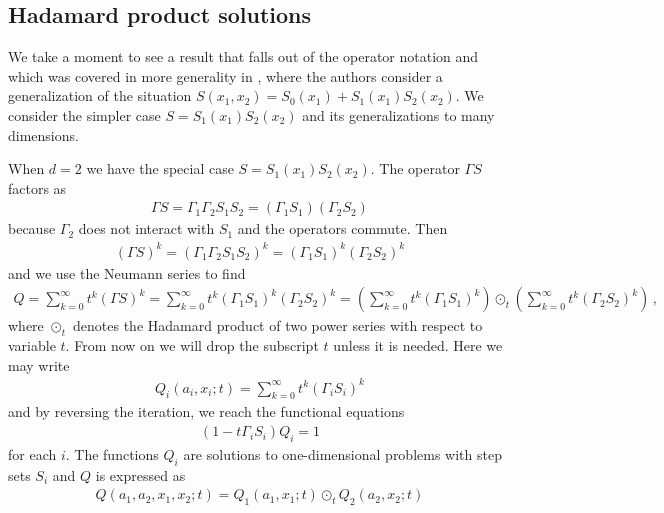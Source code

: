 \subsection{Hadamard product solutions}

We take a moment to see a result that falls out of the operator notation and which was covered in more generality in \cite{bostan2014three}, where the authors consider a generalization of the situation $S(x_1,x_2) = S_0(x_1)+S_1(x_1)S_2(x_2)$. We consider the simpler case $S = S_1(x_1)S_2(x_2)$ and its generalizations to many dimensions.
\begin{example} When $d = 2$ we have the special case $S = S_1(x_1)S_2(x_2)$. The operator $\Gamma S$ factors as
\begin{align}
	 \Gamma S = \Gamma_1\Gamma_2S_1S_2 = (\Gamma_1S_1)(\Gamma_2S_2)
\end{align}
because $\Gamma_2$ does not interact with $S_1$ and the operators commute. Then
\begin{align}
	 (\Gamma S)^k = (\Gamma_1\Gamma_2S_1S_2)^k = (\Gamma_1S_1)^k(\Gamma_2S_2)^k
\end{align}
and we use the Neumann series to find
\begin{align}
	Q = \sum_{k = 0}^{\infty} t^k (\Gamma S)^k = \sum_{k = 0}^{\infty} t^k (\Gamma_1S_1)^k(\Gamma_2S_2)^k = \left(\sum_{k = 0}^{\infty} t^k (\Gamma_1S_1)^k\right) \odot_t  \left(\sum_{k = 0}^{\infty} t^k (\Gamma_2S_2)^k\right)\,,
\end{align}
where $\odot_t$ denotes the Hadamard product of two power series with respect to variable $t$. From now on we will drop the subscript $t$ unless it is needed. Here we may write
\begin{align}
	Q_i(a_i,x_i;t)= \sum_{k = 0}^{\infty} t^k (\Gamma_iS_i)^k
\end{align}
and by reversing the iteration, we reach the functional equations
\begin{align}
	(1-t\Gamma_iS_i)Q_i = 1
\end{align}
for each $i$. The functions $Q_i$ are solutions to one-dimensional problems with step sets $S_i$ and $Q$ is expressed as
\begin{align}
	Q(a_1,a_2,x_1,x_2;t) = Q_1(a_1,x_1;t) \odot_t Q_2(a_2,x_2;t)
\end{align}
\end{example}


